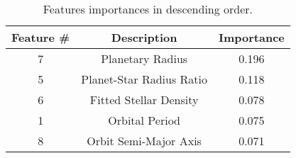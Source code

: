 \documentclass[11pt, a4paper]{article}
\begin{document}
  \begin{table}
    \centering
    \begin{tabular}{|c c c|}
    \hline
    Feature \# & Description & Importance \\
    \hline\hline
    7 & Planetary Radius & 0.196 \\
    5 & Planet-Star Radius Ratio & 0.118 \\
    6 & Fitted Stellar Density & 0.078 \\
    1 & Orbital Period & 0.075 \\
    8 & Orbit Semi-Major Axis & 0.071 \\
    \hline
    \end{tabular}
    \caption{Features importances in descending order.}
    \label{table:importances}
  \end{table}
\end{document}
